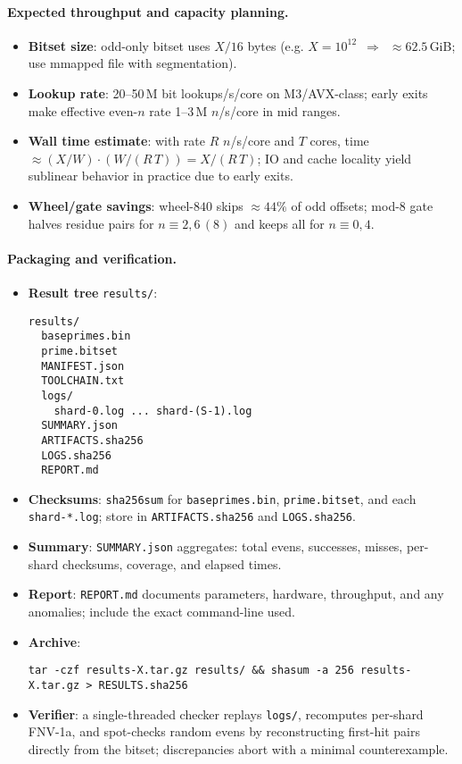 \documentclass[11pt]{article}
\theoremstyle{definition}
\theoremstyle{remark}
\begin{document}
\paragraph{Expected throughput and capacity planning.}
\begin{itemize}
  \item \textbf{Bitset size}: odd-only bitset uses $X/16$ bytes (e.g. $X=10^{12}$ \,$\Rightarrow$\, $\approx 62.5$\,GiB; use mmapped file with segmentation).
  \item \textbf{Lookup rate}: 20--50\,M bit lookups/s/core on M3/AVX-class; early exits make effective even-$n$ rate 1--3\,M $n$/s/core in mid ranges.
  \item \textbf{Wall time estimate}: with rate $R$ $n$/s/core and $T$ cores, time $\approx (X/W)\cdot (W/(R\,T)) = X/(R\,T)$; IO and cache locality yield sublinear behavior in practice due to early exits.
  \item \textbf{Wheel/gate savings}: wheel-$840$ skips $\approx 44\%$ of odd offsets; mod-8 gate halves residue pairs for $n\equiv 2,6\,(8)$ and keeps all for $n\equiv 0,4$.
\end{itemize}

\paragraph{Packaging and verification.}
\begin{itemize}
  \item \textbf{Result tree} \texttt{results/}:
  \begin{verbatim}
results/
  baseprimes.bin
  prime.bitset
  MANIFEST.json
  TOOLCHAIN.txt
  logs/
    shard-0.log ... shard-(S-1).log
  SUMMARY.json
  ARTIFACTS.sha256
  LOGS.sha256
  REPORT.md
  \end{verbatim}
  \item \textbf{Checksums}: \texttt{sha256sum} for \texttt{baseprimes.bin}, \texttt{prime.bitset}, and each \texttt{shard-*.log}; store in \texttt{ARTIFACTS.sha256} and \texttt{LOGS.sha256}.
  \item \textbf{Summary}: \texttt{SUMMARY.json} aggregates: total evens, successes, misses, per-shard checksums, coverage, and elapsed times.
  \item \textbf{Report}: \texttt{REPORT.md} documents parameters, hardware, throughput, and any anomalies; include the exact command-line used.
  \item \textbf{Archive}: \begin{verbatim}
tar -czf results-X.tar.gz results/ && shasum -a 256 results-X.tar.gz > RESULTS.sha256
  \end{verbatim}
  \item \textbf{Verifier}: a single-threaded checker replays \texttt{logs/}, recomputes per-shard FNV-1a, and spot-checks random evens by reconstructing first-hit pairs directly from the bitset; discrepancies abort with a minimal counterexample.
\end{itemize}
\end{document}

